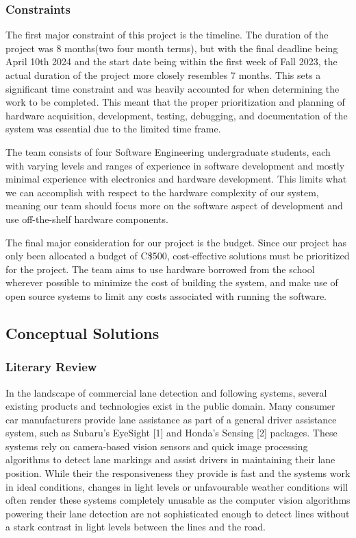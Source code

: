 \documentclass[titlepage]{article}
\begin{document}
\subsubsection{Constraints}

The first major constraint of this project is the timeline. The duration of the project was 8 months(two four month terms), but with the final deadline being April 10th 2024 and the start date being within the first week of Fall 2023, the actual duration of the project more closely resembles 7 months. This sets a significant time constraint and was heavily accounted for when determining the work to be completed. This meant that the proper prioritization and planning of hardware acquisition, development, testing, debugging, and documentation of the system was essential due to the limited time frame. 

The team consists of four Software Engineering undergraduate students, each with varying levels and ranges of experience in software development and mostly minimal experience with electronics and hardware development. This limits what we can accomplish with respect to the hardware complexity of our system, meaning our team should focus more on the software aspect of development and use off-the-shelf hardware components.

The final major consideration for our project is the budget. Since our project has only been allocated a budget of C\$500, cost-effective solutions must be prioritized for the project. The team aims to use hardware borrowed from the school wherever possible to minimize the cost of building the system, and make use of open source systems to limit any costs associated with running the software.

\subsection{Conceptual Solutions}

\subsubsection{Literary Review}

In the landscape of commercial lane detection and following systems, several existing products and technologies exist in the public domain. Many consumer car manufacturers provide lane assistance as part of a general driver assistance system, such as Subaru’s EyeSight [1] and Honda’s Sensing [2] packages. These systems rely on camera-based vision sensors and quick image processing algorithms to detect lane markings and assist drivers in maintaining their lane position. While their the responsiveness they provide is fast and the systems work in ideal conditions, changes in light levels or unfavourable weather conditions will often render these systems completely unusable as the computer vision algorithms powering their lane detection are not sophisticated enough to detect lines without a stark contrast in light levels between the lines and the road.
\end{document}
